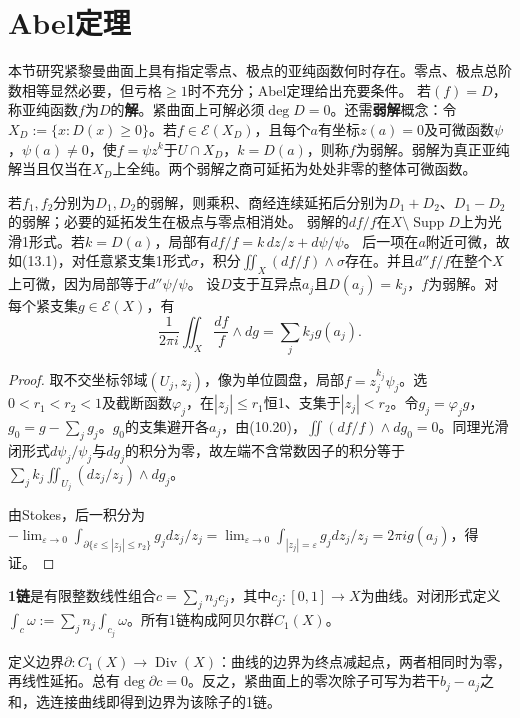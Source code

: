 \section{Abel定理}
本节研究紧黎曼曲面上具有指定零点、极点的亚纯函数何时存在。零点、极点总阶数相等显然必要，但亏格$\ge1$时不充分；Abel定理给出充要条件。
若$(f)=D$，称亚纯函数$f$为$D$的\textbf{解}。紧曲面上可解必须$\deg D=0$。还需\textbf{弱解}概念：令$X_D:=\{x:D(x)\ge0\}$。若$f\in\mathcal E(X_D)$，且每个$a$有坐标$z(a)=0$及可微函数$\psi$，$\psi(a)\ne0$，使$f=\psi z^k$于$U\cap X_D$，$k=D(a)$，则称$f$为弱解。弱解为真正亚纯解当且仅当在$X_D$上全纯。两个弱解之商可延拓为处处非零的整体可微函数。

若$f_1,f_2$分别为$D_1,D_2$的弱解，则乘积、商经连续延拓后分别为$D_1+D_2$、$D_1-D_2$的弱解；必要的延拓发生在极点与零点相消处。
弱解的$df/f$在$X\setminus\operatorname{Supp}D$上为光滑1形式。若$k=D(a)$，局部有$df/f=k\,dz/z+d\psi/\psi$。
后一项在$a$附近可微，故如(13.1)，对任意紧支集1形式$\sigma$，积分$\iint_X(df/f)\wedge\sigma$存在。并且$d''f/f$在整个$X$上可微，因为局部等于$d''\psi/\psi$。
设$D$支于互异点$a_j$且$D(a_j)=k_j$，$f$为弱解。对每个紧支集$g\in\mathcal E(X)$，有
\[
\frac1{2\pi i}\iint_X\frac{df}f\wedge dg=\sum_jk_jg(a_j).
\]
\begin{proof}
取不交坐标邻域$(U_j,z_j)$，像为单位圆盘，局部$f=z_j^{k_j}\psi_j$。选$0<r_1<r_2<1$及截断函数$\varphi_j$，在$|z_j|\le r_1$恒1、支集于$|z_j|<r_2$。令$g_j=\varphi_jg$，$g_0=g-\sum_jg_j$。$g_0$的支集避开各$a_j$，由(10.20)，$\iint(df/f)\wedge dg_0=0$。同理光滑闭形式$d\psi_j/\psi_j$与$dg_j$的积分为零，故左端不含常数因子的积分等于$\sum_jk_j\iint_{U_j}(dz_j/z_j)\wedge dg_j$。

由Stokes，后一积分为$-\lim_{\varepsilon\to0}\int_{\partial\{\varepsilon\le|z_j|\le r_2\}}g_jdz_j/z_j=\lim_{\varepsilon\to0}\int_{|z_j|=\varepsilon}g_jdz_j/z_j=2\pi ig(a_j)$，得证。
\end{proof}
\textbf{1链}是有限整数线性组合$c=\sum_jn_jc_j$，其中$c_j:[0,1]\to X$为曲线。对闭形式定义$\int_c\omega:=\sum_jn_j\int_{c_j}\omega$。所有1链构成阿贝尔群$C_1(X)$。

定义边界$\partial:C_1(X)\to\operatorname{Div}(X)$：曲线的边界为终点减起点，两者相同时为零，再线性延拓。总有$\deg\partial c=0$。反之，紧曲面上的零次除子可写为若干$b_j-a_j$之和，选连接曲线即得到边界为该除子的1链。

